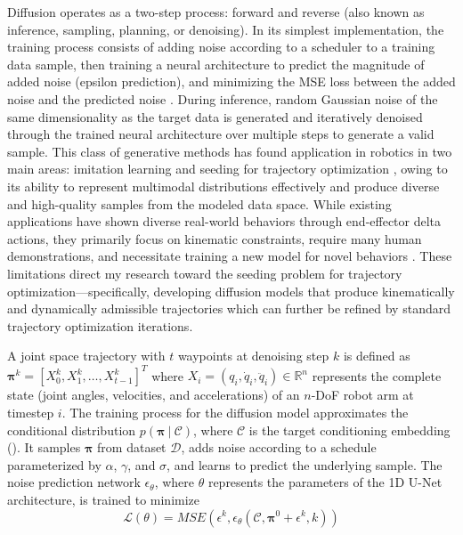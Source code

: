 

Diffusion operates as a two-step process: forward and reverse (also known as inference, sampling, planning, or denoising). In its simplest implementation, the training process consists of adding noise according to a scheduler to a training data sample, then training a neural architecture to predict the magnitude of added noise (epsilon prediction), and minimizing the MSE loss between the added noise and the predicted noise \cite{ho2020denoising}.
During inference, random Gaussian noise of the same dimensionality as the target data is generated and iteratively denoised through the trained neural architecture over multiple steps to generate a valid sample.
This class of generative methods has found application in robotics in two main areas: imitation learning \cite{chi2023diffusion,sridhar2024nomad} and seeding for trajectory optimization \cite{carvalho2023motion,huang2024diffusionseeder}, owing to its ability to represent multimodal distributions effectively and produce diverse and high-quality samples from the modeled data space.
While existing applications have shown diverse real-world behaviors through end-effector delta actions, they primarily focus on kinematic constraints, require many human demonstrations, and necessitate training a new model for novel behaviors \cite{chi2023diffusion,ajay2023is,ha2023scaling,ze20243d}. These limitations direct my research toward the seeding problem for trajectory optimization---specifically, developing diffusion models that produce kinematically and dynamically admissible trajectories which can further be refined by standard trajectory optimization iterations.

A joint space trajectory with $t$ waypoints at denoising step $k$ is defined as
$\bm{\pi}^k = [ X_0^k, X_1^k, \dots, X_{t-1}^k ]^T$
where $X_i = (q_i, \dot{q}_i, \ddot{q}_i) \in \mathbb{R}^n$ represents the complete state (joint angles, velocities, and accelerations) of an $n$-DoF robot arm at timestep $i$.
The training process for the diffusion model approximates the conditional distribution $p(\bm{\pi}\ |\ \mathcal{C})$, where $\mathcal{C}$ is the target conditioning embedding (\textcolor{customred}{}).
It samples $\bm{\pi}$ from dataset $\mathcal{D}$, adds noise according to a schedule parameterized by $\alpha$, $\gamma$, and $\sigma$, and learns to predict the underlying sample. The noise prediction network $\epsilon_\theta$, where $\theta$ represents the parameters of the 1D U-Net architecture, is trained to minimize
\begin{equation}
    \mathcal{L}(\theta) = MSE(\epsilon^k, \epsilon_\theta(\mathcal{C}, \bm{\pi}^0 + \epsilon^k, k))
\end{equation}

